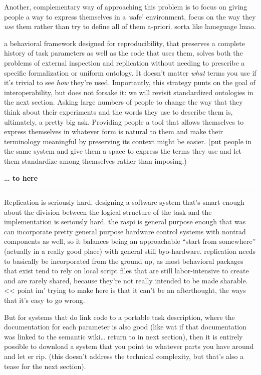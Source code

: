 \documentclass[nohyper]{tufte-book-jls}
\begin{document}
Another, complementary way of approaching this problem is to focus on
giving people a way to express themselves in a `safe' environment, focus
on the way they \emph{use} them rather than try to define all of them
a-priori. sorta like lameguage lmao.

a behavioral framework designed for reproducibility, that preserves a
complete history of task parameters as well as the code that uses them,
solves both the problems of external inspection and replication without
needing to prescribe a specific formalization or uniform ontology. It
doesn't matter \emph{what} terms you use if it's trivial to see
\emph{how} they're used. Importantly, this strategy punts on the goal of
interoperability, but does not forsake it: we will revisit standardized
ontologies in the next section. Asking large numbers of people to change
the way that they think about their experiments and the words they use
to describe them is, ultimately, a pretty big ask. Providing people a
tool that allows themselves to express themselves in whatever form is
natural to them and make their terminology meaningful by preserving its
context might be easier. (put people in the same system and give them a
space to express the terms they use and let them standardize among
themselves rather than imposing.)

\textbf{\ldots{} to here}

\begin{center}\rule{0.5\linewidth}{0.5pt}\end{center}

Replication is seriously hard. designing a software system that's smart
enough about the division between the logical structure of the task and
the implementation is seriously hard. the raspi is general purpose
enough that was can incorporate pretty general purpose hardware control
systems with nontrad components as well, so it balances being an
approachable ``start from somewhere'' (actually in a really good place)
with general still byo-hardware. replication needs to basically be
incorporated from the ground up, as most behavioral packages that exist
tend to rely on local script files that are still labor-intensive to
create and are rarely shared, because they're not really intended to be
made sharable. \textless\textless{} point im' trying to make here is
that it can't be an afterthought, the ways that it's easy to go wrong.

But for systems that do link code to a portable task description, where
the documentation for each parameter is also good (like wat if that
documentation was linked to the semantic wiki\ldots{} return to in next
section), then it is entirely possible to download a system that you
point to whatever parts you have around and let er rip. (this doesn't
address the technical complexity, but that's also a tease for the next
section).
\end{document}
